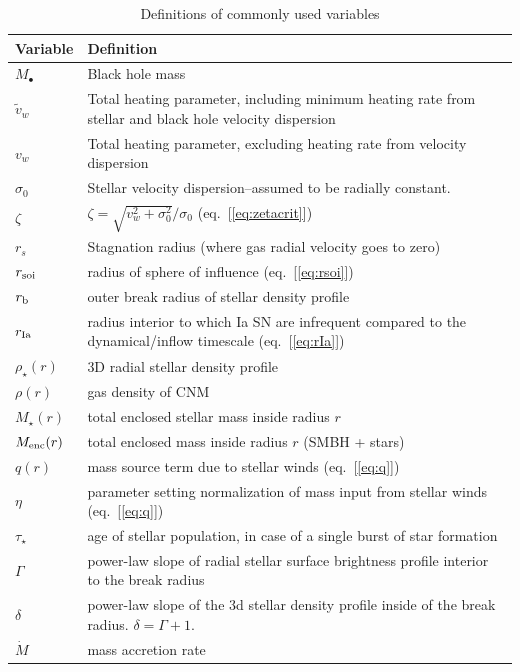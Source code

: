 \documentclass[usenatbib,fleqn]{mn2e}
\begin{document}
\begin{table}
\begin{threeparttable}
\begin{minipage}{18cm}
\caption{Definitions of commonly used variables}
\begin{tabular}{ll}
\hline
{Variable} & {Definition} \\
\hline
$M_{\bullet}$ & Black hole mass \\
$\tilde{v}_{w}$ & Total heating parameter, including minimum heating
rate from stellar and black hole velocity dispersion \\
$v_{w}$ & Total heating parameter, excluding heating rate from
velocity dispersion \\
$\sigma_0$ & Stellar velocity dispersion--assumed to be radially constant.\\
$\zeta$ & $\zeta=\sqrt{v_w^2+\sigma_0^2}/\sigma_0$ (eq.~[\ref{eq:zetacrit}])\\
$r_{s}$ & Stagnation radius (where gas radial velocity goes to zero) \\
$r_{\rm soi}$ & radius of sphere of influence (eq.~[\ref{eq:rsoi}]) \\
$r_{\rm b}$ & outer break radius of stellar density profile \\ 
$r_{\rm Ia}$ & radius interior to which Ia SN are infrequent compared to the dynamical/inflow timescale (eq.~[\ref{eq:rIa}]) \\ 
$\rho_{\star}(r)$ & 3D radial stellar density profile \\
$\rho(r)$ & gas density of CNM \\
$M_{\star}(r)$ & total enclosed stellar mass inside radius $r$ \\
$M_{\rm enc}(r)$ & total enclosed mass inside radius $r$ (SMBH + stars) \\
$q(r)$ & mass source term due to stellar winds (eq.~[\ref{eq:q}]) \\
$\eta$ & parameter setting normalization of mass input from stellar winds (eq.~[\ref{eq:q}]) \\
$\tau_{\star}$ & age of stellar population, in case of a single burst of star formation \\
$\Gamma$ & power-law slope of radial stellar surface brightness
profile interior to the break radius \\
$\delta$ & power-law slope of the 3d stellar density profile inside of
the break radius. $\delta=\Gamma+1$.\\
$\dot{M}$ & mass accretion rate \\

\end{tabular}
\end{minipage}
\end{threeparttable}
\end{table}
\end{document}
